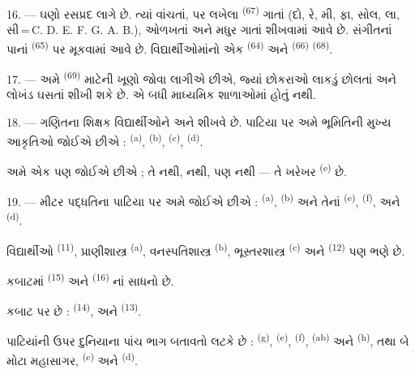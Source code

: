 16. ---  ઘણો રસપ્રદ લાગે છે. ત્યાં
 વાંચતાં,  પર લખેલા 
\textsuperscript{(67)} ગાતાં (દો, રે, મી, ફા, સોલ, લા, સી\,=\,C. D. E.
F. G. A. B.),  ઓળખતાં અને મધુર  ગાતાં
શીખવામાં આવે છે. સંગીતનાં પાનાં  \textsuperscript{(65)} પર
મૂકવામાં આવે છે. વિદ્યાર્થીઓમાંનો એક 
\textsuperscript{(64)} અને  \textsuperscript{(66)}
 \textsuperscript{(68)}.

17. --- અમે  \textsuperscript{(69)} માટેની
 ખૂણો જોવા લાગીએ છીએ, જ્યાં છોકરાઓ લાકડું
છોલતાં અને લોખંડ ઘસતાં શીખી શકે છે. એ બધી માધ્યમિક શાળાઓમાં હોતું
નથી.

\VUsaut{5.0mm}
\VUsaut{3.6mm}

18. --- ગણિતના શિક્ષક વિદ્યાર્થીઓને 
અને  શીખવે છે. પાટિયા પર અમે ભૂમિતિની મુખ્ય
આકૃતિઓ જોઈએ છીએ :  \textsuperscript{(a)},
 \textsuperscript{(b)}, 
\textsuperscript{(c)},  \textsuperscript{(d)}.

અમે એક  પણ જોઈએ છીએ ; તે  નથી,
 નથી,  પણ નથી — તે ખરેખર
 \textsuperscript{(e)} છે.

19. --- મીટર પદ્ધતિના પાટિયા પર અમે જોઈએ છીએ : 
\textsuperscript{(a)},  \textsuperscript{(b)} અને તેનાં
  \textsuperscript{(e)},
 \textsuperscript{(f)},  અને
 \textsuperscript{(d)}.

વિદ્યાર્થીઓ  \textsuperscript{(11)},
પ્રાણીશાસ્ત્ર \textsuperscript{(a)}, વનસ્પતિશાસ્ત્ર
\textsuperscript{(b)}, ભૂસ્તરશાસ્ત્ર \textsuperscript{(c)} અને
 \textsuperscript{(12)} પણ ભણે છે.

કબાટમાં  \textsuperscript{(15)} અને
 \textsuperscript{(16)} નાં સાધનો છે.

કબાટ પર છે :  \textsuperscript{(14)},  અને
 \textsuperscript{(13)}.

પાટિયાંની ઉપર દુનિયાના પાંચ ભાગ બતાવતો  લટકે છે :
 \textsuperscript{(g)}, 
\textsuperscript{(e)},  \textsuperscript{(f)},
 \textsuperscript{(ab)} અને 
\textsuperscript{(h)}, તથા બે મોટા મહાસાગર, 
\textsuperscript{(c)} અને  \textsuperscript{(d)}.

\VUsaut{6.0mm}
\VUfilet{22mm}
